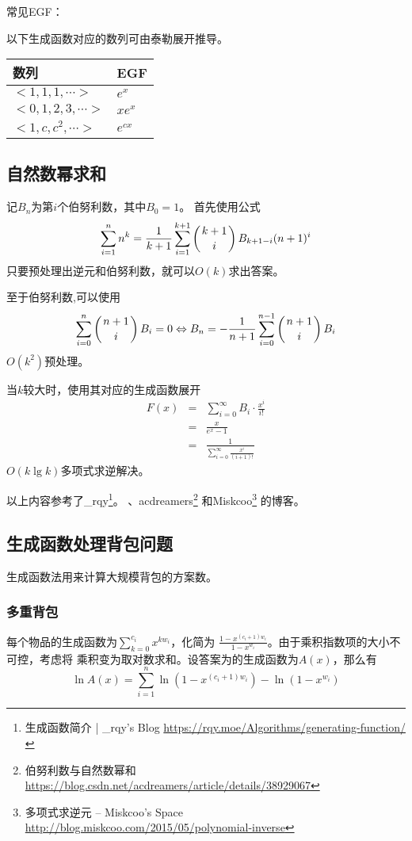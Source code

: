 常见EGF：

以下生成函数对应的数列可由泰勒展开推导。

\begin{tabular}{|l|l|}
	\hline
	数列               & EGF      \\
	\hline
	$<1,1,1,\cdots>$   & $e^x$    \\
	\hline
	$<0,1,2,3,\cdots>$ & $xe^x$   \\
	\hline
	$<1,c,c^2,\cdots>$ & $e^{cx}$ \\
	\hline
\end{tabular}

\subsection{自然数幂求和}

记$B_n$为第$i$个伯努利数，其中$B_0=1$。
首先使用公式
\begin{displaymath}
	\sum_{i=1}^n{n^k}=\frac{1}{k+1}\sum_{i=1}^{k+1}{\left(k+1 \atop i\right)B_{k+1-i}(n+1)^i}
\end{displaymath}
只要预处理出逆元和伯努利数，就可以$O(k)$求出答案。

至于伯努利数,可以使用
\begin{displaymath}
	\sum_{i=0}^n{\left(n+1 \atop i\right)B_i}=0
	\Leftrightarrow
	B_n=-\frac{1}{n+1}\sum_{i=0}^{n-1}{\left(n+1 \atop i\right)B_i}
\end{displaymath}
$O(k^2)$预处理。

当$k$较大时，使用其对应的生成函数展开
\begin{eqnarray*}
    F(x)&=&\sum_{i=0}^\infty{B_i\cdot\frac{x^i}{i!}}\\
    &=&\frac{x}{e^x-1}\\
	&=&\frac{1}{\displaystyle \sum_{i=0}^\infty{\frac{x^i}{(i+1)!}}}
\end{eqnarray*}
$O(k\lg k)$多项式求逆解决。

以上内容参考了\_rqy\footnote{生成函数简介 | \_rqy's Blog
	\url{https://rqy.moe/Algorithms/generating-function/}
}。
、acdreamers\footnote{伯努利数与自然数幂和
	\url{https://blog.csdn.net/acdreamers/article/details/38929067}
}
和Miskcoo\footnote{多项式求逆元 – Miskcoo's Space
	\url{http://blog.miskcoo.com/2015/05/polynomial-inverse}
}
的博客。
\subsection{生成函数处理背包问题}
生成函数法用来计算大规模背包的方案数。
\subsubsection{多重背包}
每个物品的生成函数为$\displaystyle \sum_{k=0}^{c_i}{x^{kw_i}}$，化简为
$\frac{1-x^{(c_i+1)w_i}}{1-x^{w_i}}$。由于乘积指数项的大小不可控，考虑将
乘积变为取对数求和。设答案为的生成函数为$A(x)$，那么有
\begin{displaymath}
\ln A(x)=\sum_{i=1}^n{\ln(1-x^{(c_i+1)w_i})-\ln (1-x^{w_i})}
\end{displaymath}

